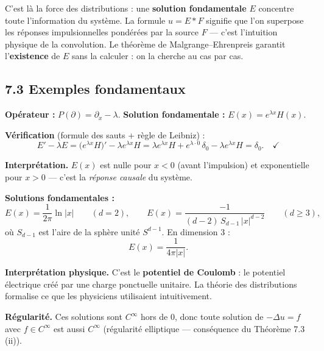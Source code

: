 \documentclass[12pt,a4paper]{article}
\newenvironment{attention}{%
  \begin{tcolorbox}[enhanced, breakable,
    colback=white, colframe=black,
    fonttitle=\bfseries\sffamily, title={À retenir},
    borderline west={2pt}{0pt}{black}, frame hidden,
    left=10pt, right=6pt, top=4pt, bottom=4pt]
}{%
  \end{tcolorbox}}
\newenvironment{exemple}[1]{%
  \begin{tcolorbox}[enhanced, breakable,
    colback=GrisClair, colframe=GrisMoyen,
    fonttitle=\bfseries\sffamily, title={Exemple — #1},
    left=6pt, right=6pt, top=4pt, bottom=4pt, arc=3pt]
}{%
  \end{tcolorbox}}
\begin{document}
\begin{attention}
C'est là la force des distributions : une \textbf{solution fondamentale} $E$ concentre
toute l'information du système. La formule $u = E * F$ signifie que l'on superpose
les réponses impulsionnelles pondérées par la source $F$ — c'est l'intuition physique
de la convolution. Le théorème de Malgrange–Ehrenpreis garantit l'\textbf{existence}
de $E$ sans la calculer : on la cherche au cas par cas.
\end{attention}

\subsection*{7.3 \quad Exemples fondamentaux}

\begin{exemple}{Équation de transport : $u' - \lambda u = f$}
\textbf{Opérateur :} $P(\partial) = \partial_x - \lambda$.
\textbf{Solution fondamentale :} $E(x) = e^{\lambda x}H(x)$.

\medskip
\textbf{Vérification} (formule des sauts + règle de Leibniz) :
\[
  E' - \lambda E
  = \bigl(e^{\lambda x}H\bigr)' - \lambda e^{\lambda x}H
  = \lambda e^{\lambda x}H + e^{\lambda \cdot 0}\,\delta_0 - \lambda e^{\lambda x}H
  = \delta_0. \quad\checkmark
\]

\textbf{Interprétation.} $E(x)$ est nulle pour $x < 0$ (avant l'impulsion) et
exponentielle pour $x > 0$ — c'est la \emph{réponse causale} du système.
\end{exemple}

\begin{exemple}{Laplacien en dimension $d \geq 2$ : $-\Delta u = f$}
\textbf{Solutions fondamentales :}
\[
  E(x) = \frac{1}{2\pi}\ln|x| \qquad (d = 2),
  \qquad
  E(x) = \frac{-1}{(d-2)\,S_{d-1}\,|x|^{d-2}} \qquad (d \geq 3),
\]
où $S_{d-1}$ est l'aire de la sphère unité $S^{d-1}$. En dimension $3$ :
\[
  E(x) = \frac{1}{4\pi|x|}.
\]

\textbf{Interprétation physique.} C'est le \textbf{potentiel de Coulomb} : le
potentiel électrique créé par une charge ponctuelle unitaire. La théorie des
distributions formalise ce que les physiciens utilisaient intuitivement.

\medskip
\textbf{Régularité.} Ces solutions sont $C^\infty$ hors de $0$, donc toute
solution de $-\Delta u = f$ avec $f \in C^\infty$ est aussi $C^\infty$
(régularité elliptique — conséquence du Théorème 7.3\,(ii)).
\end{exemple}
\end{document}
